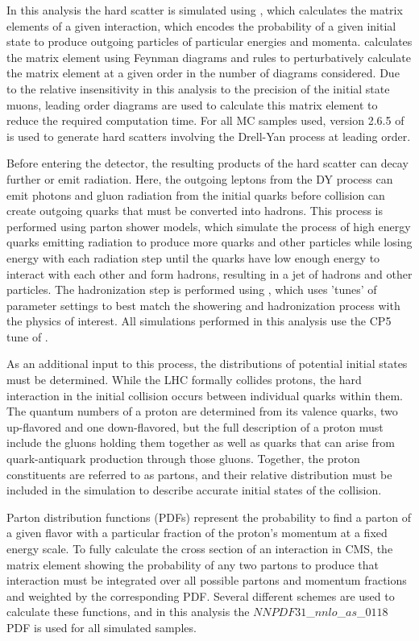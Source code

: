 In this analysis the hard scatter is simulated using \mg \cite{Maltoni_2003}, which calculates the matrix elements of a given interaction, which encodes the probability of a given initial state to produce outgoing particles of particular energies and momenta.
\mg calculates the matrix element using Feynman diagrams and rules to perturbatively calculate the matrix element at a given order in the number of diagrams considered.
Due to the relative insensitivity in this analysis to the precision of the initial state muons, leading order diagrams are used to calculate this matrix element to reduce the required computation time.
For all MC samples used, version 2.6.5 of \mg is used to generate hard scatters involving the Drell-Yan process at leading order. 

Before entering the detector, the resulting products of the hard scatter can decay further or emit radiation.
Here, the outgoing leptons from the DY process can emit photons and gluon radiation from the initial quarks before collision can create outgoing quarks that must be converted into hadrons. 
This process is performed using parton shower models, which simulate the process of high energy quarks emitting radiation to produce more quarks and other particles while losing energy with each radiation step until the quarks have low enough energy to interact with each other and form hadrons, resulting in a jet of hadrons and other particles.
The hadronization step is performed using \pythia, which uses 'tunes' of parameter settings to best match the showering and hadronization process with the physics of interest. 
All simulations performed in this analysis use the CP5 tune of \pythia \cite{pythia_tune}. 

As an additional input to this process, the distributions of potential initial states must be determined.
While the LHC formally collides protons, the hard interaction in the initial collision occurs between individual quarks within them.
The quantum numbers of a proton are determined from its valence quarks, two up-flavored and one down-flavored, but the full description of a proton must include the gluons holding them together as well as quarks that can arise from quark-antiquark production through those gluons. 
Together, the proton constituents are referred to as partons, and their relative distribution must be included in the simulation to describe accurate initial states of the collision.

Parton distribution functions (PDFs) represent the probability to find a parton of a given flavor with a particular fraction of the proton's momentum at a fixed energy scale.
To fully calculate the cross section of an interaction in CMS, the matrix element showing the probability of any two partons to produce that interaction must be integrated over all possible partons and momentum fractions and weighted by the corresponding PDF. 
Several different schemes are used to calculate these functions, and in this analysis the $NNPDF31$\_$nnlo$\_$as$\_$0118$ PDF \cite{nnpdf} is used for all simulated samples.


